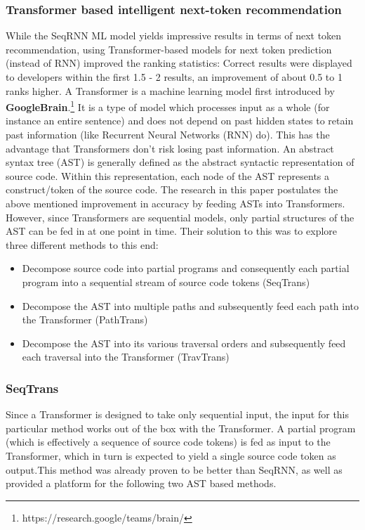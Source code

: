 \documentclass[sigplan,screen,9pt]{acmart}
\begin{document}
\subsubsection{Transformer based intelligent next-token recommendation}
While the SeqRNN ML model yields impressive results in terms of next token recommendation, using Transformer-based models for next token prediction (instead of RNN) improved the ranking statistics: Correct results were displayed to developers within the first 1.5 - 2 results, an improvement of about 0.5 to 1 ranks higher.\cite{FeedTree}
\newline
A Transformer is a machine learning model first introduced by \textbf{GoogleBrain}.\footnote{https://research.google/teams/brain/} It is a type of model which processes input as a whole (for instance an entire sentence) and does not depend on past hidden states to retain past information (like Recurrent Neural Networks (RNN) do).\cite{vaswani2017attention} This has the advantage that Transformers don't risk losing past information.
\newline
An abstract syntax tree (AST) is generally defined as the abstract syntactic representation of source code.\cite{AST} Within this representation, each node of the AST represents a construct/token of the source code. The research in this paper postulates the above mentioned improvement in accuracy by feeding ASTs into Transformers. However, since Transformers are sequential models, only partial structures of the AST can be fed in at one point in time. Their solution to this was to explore three different methods to this end:\cite{FeedTree}
\begin{itemize}
    \item Decompose source code into partial programs and consequently each partial program into a sequential stream of source code tokens (SeqTrans)
    \item Decompose the AST into multiple paths and subsequently feed each path into the Transformer (PathTrans)
    \item Decompose the AST into its various traversal orders and subsequently feed each traversal into the Transformer (TravTrans)
\end{itemize}

\subsubsection{SeqTrans}
Since a Transformer is designed to take only sequential input, the input for this particular method works out of the box with the Transformer. A partial program (which is effectively a sequence of source code tokens) is fed as input to the Transformer, which in turn is expected to yield a single source code token as output.This method was already proven to be better than SeqRNN, as well as provided a platform for the following two AST based methods.
\end{document}
